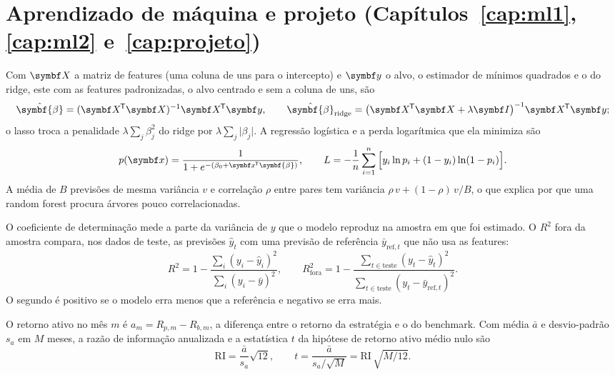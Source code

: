 \section{Aprendizado de máquina e projeto (Capítulos~\ref{cap:ml1}, \ref{cap:ml2} e~\ref{cap:projeto})}

Com $\vetor{X}$ a matriz de features (uma coluna de uns para o intercepto) e $\vetor{y}$ o alvo, o estimador de mínimos quadrados e o do ridge, este com as features padronizadas, o alvo centrado e sem a coluna de uns, são
\begin{equation*}
\hat{\symbf{\beta}} = (\vetor{X}\T\vetor{X})^{-1}\vetor{X}\T\vetor{y} , \qquad
\hat{\symbf{\beta}}_{\text{ridge}} = \big(\vetor{X}\T\vetor{X} + \lambda \vetor{I}\big)^{-1} \vetor{X}\T \vetor{y} ;
\end{equation*}
o lasso troca a penalidade $\lambda\sum_j \beta_j^2$ do ridge por $\lambda\sum_j \lvert\beta_j\rvert$. A regressão logística e a perda logarítmica que ela minimiza são
\begin{equation*}
p(\vetor{x}) = \frac{1}{1 + e^{-(\beta_0 + \vetor{x}\T\symbf{\beta})}} , \qquad
L = -\frac{1}{n} \sum_{i=1}^{n} \Big[ y_i \ln p_i + (1 - y_i) \ln (1 - p_i) \Big] .
\end{equation*}
A média de $B$ previsões de mesma variância $v$ e correlação $\rho$ entre pares tem variância $\rho\,v + (1-\rho)\,v/B$, o que explica por que uma random forest procura árvores pouco correlacionadas.

O coeficiente de determinação mede a parte da variância de $y$ que o modelo reproduz na amostra em que foi estimado. O $R^2$ fora da amostra compara, nos dados de teste, as previsões $\hat y_t$ com uma previsão de referência $\bar y_{\text{ref}, t}$ que não usa as features:
\begin{equation*}
R^2 = 1 - \frac{\sum_i (y_i - \hat y_i)^2}{\sum_i (y_i - \bar y)^2} , \qquad
R^2_{\text{fora}} = 1 - \frac{\sum_{t \in \text{teste}} (y_t - \hat y_t)^2}{\sum_{t \in \text{teste}} (y_t - \bar y_{\text{ref}, t})^2} .
\end{equation*}
O segundo é positivo se o modelo erra menos que a referência e negativo se erra mais.

O retorno ativo no mês $m$ é $a_m = R_{p,m} - R_{b,m}$, a diferença entre o retorno da estratégia e o do benchmark. Com média $\bar a$ e desvio-padrão $s_a$ em $M$ meses, a razão de informação anualizada e a estatística $t$ da hipótese de retorno ativo médio nulo são
\begin{equation*}
\mathrm{RI} = \frac{\bar a}{s_a}\sqrt{12} , \qquad
t = \frac{\bar a}{s_a / \sqrt{M}} = \mathrm{RI}\,\sqrt{M/12} .
\end{equation*}
